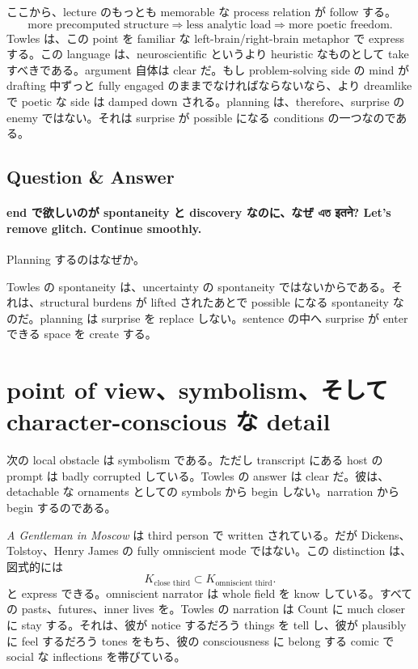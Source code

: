 ここから、lecture のもっとも memorable な process relation が follow する。
\begin{equation}
\text{more precomputed structure} \Rightarrow \text{less analytic load} \Rightarrow \text{more poetic freedom}.
\end{equation}
Towles は、この point を familiar な left-brain/right-brain metaphor で express する。この language は、neuroscientific というより heuristic なものとして take すべきである。argument 自体は clear だ。もし problem-solving side の mind が drafting 中ずっと fully engaged のままでなければならないなら、より dreamlike で poetic な side は damped down される。planning は、therefore、surprise の enemy ではない。それは surprise が possible になる conditions の一つなのである。

\subsection{Question \& Answer}

\paragraph{end で欲しいのが spontaneity と discovery なのに、なぜ এত इतने? Let's remove glitch. Continue smoothly.} Planning するのはなぜか。

Towles の spontaneity は、uncertainty の spontaneity ではないからである。それは、structural burdens が lifted されたあとで possible になる spontaneity なのだ。planning は surprise を replace しない。sentence の中へ surprise が enter できる space を create する。

\section{point of view、symbolism、そして character-conscious な detail}

次の local obstacle は symbolism である。ただし transcript にある host の prompt は badly corrupted している。Towles の answer は clear だ。彼は、detachable な ornaments としての symbols から begin しない。narration から begin するのである。

\emph{A Gentleman in Moscow} は third person で written されている。だが Dickens、Tolstoy、Henry James の fully omniscient mode ではない。この distinction は、図式的には
\begin{equation}
K_{\text{close third}} \subset K_{\text{omniscient third}}.
\end{equation}
と express できる。omniscient narrator は whole field を know している。すべての pasts、futures、inner lives を。Towles の narration は Count に much closer に stay する。それは、彼が notice するだろう things を tell し、彼が plausibly に feel するだろう tones をもち、彼の consciousness に belong する comic で social な inflections を帯びている。

